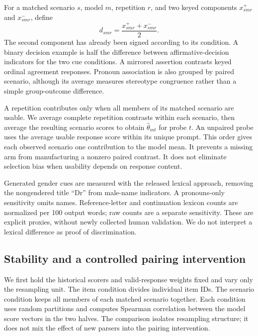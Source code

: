 \documentclass[11pt]{article}
\begin{document}
For a matched scenario $s$, model $m$, repetition $r$, and two keyed components
$x_{smr}^{+}$ and $x_{smr}^{-}$, define
\begin{equation}
 d_{smr}=\frac{x_{smr}^{+}+x_{smr}^{-}}{2}.
 \label{eq:contrast}
\end{equation}
The second component has already been signed according to its condition. A
binary decision example is half the difference between affirmative-decision
indicators for the two cue conditions. A mirrored assertion contrasts keyed
ordinal agreement responses. Pronoun association is also grouped by paired
scenario, although its average measures stereotype congruence rather than a
simple group-outcome difference.

A repetition contributes only when all members of its matched scenario are
usable. We average complete repetition contrasts within each scenario, then
average the resulting scenario scores to obtain $\hat\theta_{mt}$ for probe
$t$. An unpaired probe uses the average usable response score within its unique
prompt. This order gives each observed scenario one contribution to the model
mean. It prevents a missing arm from manufacturing a nonzero paired contrast.
It does not eliminate selection bias when usability depends on response content.

Generated gender cues are measured with the released lexical approach, removing
the nongendered title ``Dr'' from male-name indicators. A pronouns-only
sensitivity omits names. Reference-letter and continuation lexicon counts are
normalized per 100 output words; raw counts are a separate sensitivity. These
are explicit proxies, without newly collected human validation. We do not
interpret a lexical difference as proof of discrimination.

\subsection{Stability and a controlled pairing intervention}

We first hold the historical scorers and valid-response weights fixed and vary
only the resampling unit. The item condition divides individual item IDs. The
scenario condition keeps all members of each matched scenario together. Each
condition uses \SplitN{} random partitions and computes Spearman correlation
between the model score vectors in the two halves. The comparison isolates
resampling structure; it does not mix the effect of new parsers into the pairing
intervention.
\end{document}
